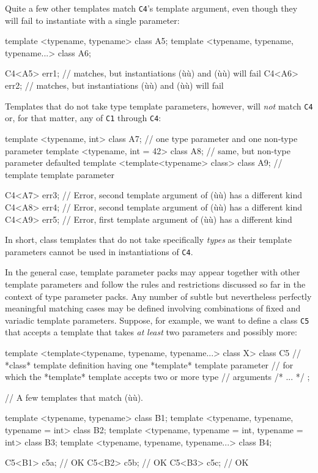 \noindent Quite a few other templates match \lstinline!C4!'s template argument, even
though they will fail to instantiate with a single parameter:

\begin{emcppslisting}
template <typename, typename> class A5;
template <typename, typename, typename...> class A6;

C4<A5> err1;  // matches, but instantiations (ù{}ù) and (ù{}ù) will fail
C4<A6> err2;  // matches, but instantiations (ù{}ù) and (ù{}ù) will fail
\end{emcppslisting}
    

\noindent Templates that do not take type template parameters, however, will
\emph{not} match \lstinline!C4! or, for that matter, any of \lstinline!C1!
through \lstinline!C4!:

\begin{emcppslisting}
template <typename, int>
class A7;                      // one type parameter and one non-type parameter
template <typename, int = 42>
class A8;                      // same, but non-type parameter defaulted
template <template<typename> class>
class A9;                      // template template parameter

C4<A7> err3;  // Error, second template argument of (ù{}ù) has a different kind
C4<A8> err4;  // Error, second template argument of (ù{}ù) has a different kind
C4<A9> err5;  // Error, first template argument of (ù{}ù) has a different kind
\end{emcppslisting}
    

\noindent In short, class templates that do not take specifically \emph{types} as
their template parameters cannot be used in instantiations of
\lstinline!C4!.

In the general case, template parameter packs may appear together with
other template parameters and follow the rules and restrictions
discussed so far in the context of type parameter packs. Any number of
subtle but nevertheless perfectly meaningful matching cases may be
defined involving combinations of fixed and variadic template
parameters. Suppose, for example, we want to define a class \lstinline!C5!
that accepts a template that takes \emph{at} \emph{least} two parameters
and possibly more:

\begin{emcppslisting}
template <template<typename, typename, typename...> class X>
class C5
    // *class* template definition having one *template* template parameter
    // for which the *template* template accepts two or more type
    // arguments
{ /* ... */ };

// A few templates that match (ù{}ù).

template <typename, typename> class B1;
template <typename, typename, typename = int> class B2;
template <typename, typename = int, typename = int> class B3;
template <typename, typename, typename...> class B4;

C5<B1> c5a;  // OK
C5<B2> c5b;  // OK
C5<B3> c5c;  // OK
\end{emcppslisting}
    

